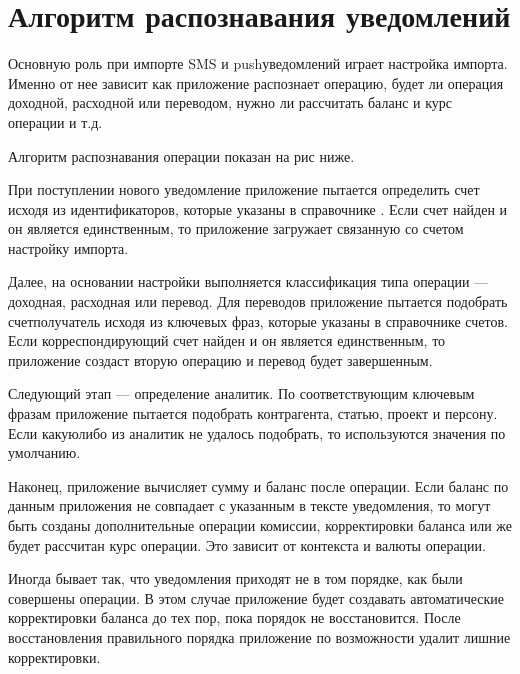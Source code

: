 \documentclass[a4paper,10pt,russian]{sphinxmanual}
\begin{document}
\section{Алгоритм распознавания уведомлений}
\label{\detokenize{notifications:id1}}
\sphinxAtStartPar
Основную роль при импорте SMS и push\sphinxhyphen{}уведомлений играет настройка импорта. Именно от нее зависит
как приложение распознает операцию, будет ли операция доходной, расходной или переводом, нужно ли
рассчитать баланс и курс операции и т.д.

\sphinxAtStartPar
Алгоритм распознавания операции показан на рис ниже.


\sphinxAtStartPar
При поступлении нового уведомление приложение пытается определить счет исходя из идентификаторов,
которые указаны в справочнике . Если счет найден и он является единственным, то приложение
загружает связанную со счетом настройку импорта.

\sphinxAtStartPar
Далее, на основании настройки выполняется классификация типа операции — доходная, расходная или перевод.
Для переводов приложение пытается подобрать счет\sphinxhyphen{}получатель исходя из ключевых фраз,
которые указаны в справочнике счетов. Если корреспондирующий счет найден и он является единственным, то
приложение создаст вторую операцию и перевод будет завершенным.

\sphinxAtStartPar
Следующий этап — определение аналитик. По соответствующим ключевым фразам приложение пытается подобрать
контрагента, статью, проект и персону. Если какую\sphinxhyphen{}либо из
аналитик не удалось подобрать, то используются значения по умолчанию.

\sphinxAtStartPar
Наконец, приложение вычисляет сумму и баланс после операции. Если баланс по данным приложения не совпадает
с указанным в тексте уведомления, то могут быть созданы дополнительные операции комиссии, корректировки баланса
или же будет рассчитан курс операции. Это зависит от контекста и валюты операции.

\sphinxAtStartPar
Иногда бывает так, что уведомления приходят не в том порядке, как были совершены операции. В этом случае приложение
будет создавать автоматические корректировки баланса до тех пор, пока порядок не восстановится. После восстановления
правильного порядка приложение по возможности удалит лишние корректировки.
\end{document}
